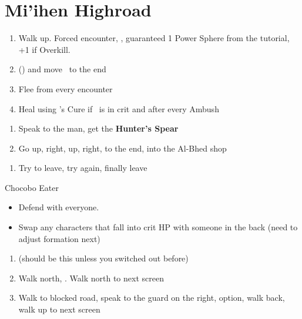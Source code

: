 \chapter{Mi'ihen Highroad}

\begin{enumerate}
    \item Walk up. Forced encounter, \sd, guaranteed 1 Power Sphere from the tutorial, +1 if Overkill.
    \item \formation{\tidus}{\wakka}{\auron} (\swap{\yuna}{\auron}) and move \yuna\ to the end
    \item Flee from every encounter
    \item Heal using \yuna's Cure if \tidus\ is in crit and after every Ambush
\end{enumerate}
\wincb\losscb\bothcb
\begin{enumerate}[resume]
    \item Speak to the man, get the \textbf{Hunter's Spear}
    \item Go up, right, up, right, to the end, into the Al-Bhed shop
\end{enumerate}
\begin{enumerate}[resume]
    \item Try to leave, try again, finally leave
\end{enumerate}
\begin{battle}{Chocobo Eater}
    \begin{itemize}
        \tidusf Haste Boss
        \item Defend with everyone.
        \item Swap any characters that fall into crit HP with someone in the back (need to adjust formation next)
    \end{itemize}
\end{battle}
\begin{enumerate}[resume]
    \item \formation{\tidus}{\wakka}{\auron} (should be this unless you switched out before)
    \item Walk north, \save. Walk north to next screen
    \item Walk to blocked road, speak to the guard on the right,  option, walk back, walk up to next screen
\end{enumerate}
